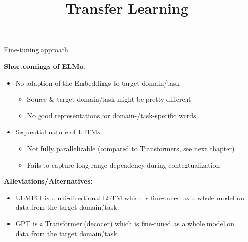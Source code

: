 



\newcommand{\titlefigure}{figure/ulmfit_sq.png}
\newcommand{\learninggoals}{
\item tbd}

\title{Transfer Learning}
\date{}




\begin{vbframe}{Fine-tuning approach}

\vfill

\textbf{Shortcomings of ELMo:}

	\begin{itemize}
		\item No adaption of the Embeddings to target domain/task
			\begin{itemize}
				\item Source \& target domain/task might be pretty different
				\item No good representations for domain-/task-specific words
			\end{itemize}
		\item Sequential nature of LSTMs:
			\begin{itemize}
				\item Not fully parallelizable (compared to Transformers, see next chapter)
				\item Fails to capture long-range dependency during contextualization
			\end{itemize}
	\end{itemize}

	\vspace{.3cm}
	
	\textbf{Alleviations/Alternatives:}

	\begin{itemize}
		\item ULMFiT \href{https://www.aclweb.org/anthology/P18-1031.pdf}{} is a uni-directional LSTM which is fine-tuned as a whole model on data from the target domain/task.
		\item GPT \href{https://s3-us-west-2.amazonaws.com/openai-assets/research-covers/language-unsupervised/language_understanding_paper.pdf}{} is a Transformer (decoder) which is fine-tuned as a whole model on data from the target domain/task.
	\end{itemize}
	
\vfill

\end{vbframe}


